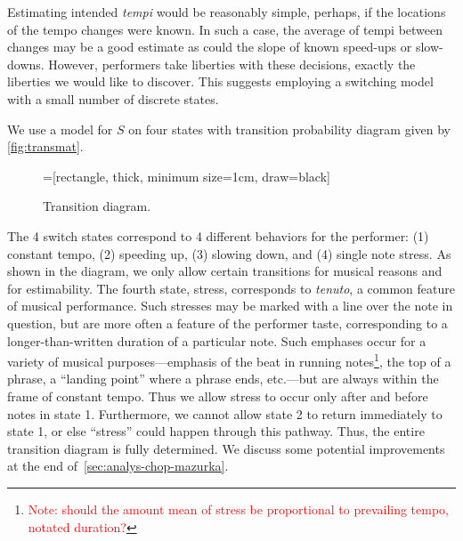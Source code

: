 \documentclass[12pt]{article}
\newcommand{\attn}[1]{\textcolor{red}{Note: #1}}
\begin{document}
Estimating intended {\em tempi} would be reasonably simple, perhaps, 
if the locations of the tempo changes were known. In such a case,
the average of tempi between changes may be a good estimate as
could the slope of known speed-ups or slow-downs. However, performers
take liberties with these decisions, exactly the liberties we would
like to discover. This suggests employing a switching model with a
small number of discrete states.

We use a model for $S$ on four states
with transition probability
diagram given by \autoref{fig:transmat}.
\begin{figure}[tb!]
  \centering
  =[rectangle,
  thick, minimum size=1cm, draw=black]
  \caption{Transition diagram. \label{fig:transmat}}
\end{figure}
The 4 switch states correspond to 4 different behaviors for the
performer: (1) constant tempo, (2) speeding up, (3) slowing down, and
(4) single note stress. As shown in the diagram, we only allow certain
transitions for musical reasons and for estimability. The fourth
state, stress, corresponds to {\em tenuto}, a common feature of
musical performance. Such stresses may be marked with a line over the
note in question, but are more often a feature of the performer taste,
corresponding to a longer-than-written duration of a particular
note. Such emphases occur for a variety of musical purposes---emphasis
of the beat in running notes\footnote{\attn{should the amount mean of stress be
  proportional to prevailing tempo, notated duration?}}, the top of a
phrase, a ``landing point'' where a phrase ends, etc.---but are always
within the frame of constant tempo. Thus we allow stress to occur only
after and before notes in state 1. Furthermore, we cannot allow
state 2 to return immediately to state 1, or else ``stress'' could
happen through this pathway. Thus, the entire transition diagram is
fully determined. We discuss some potential improvements at the end
of~\autoref{sec:analys-chop-mazurka}. 
\end{document}
